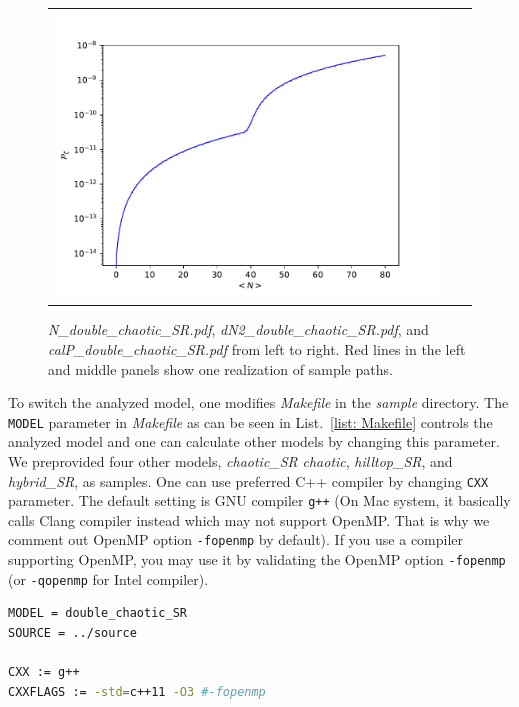 \documentclass[aps, prd
, preprint
, nofootinbib 
, notitlepage
, superscriptaddress
, longbibliography
]{revtex4-1}
\begin{document}
\begin{figure}
\begin{tabular}{ccc}
\begin{minipage}{0.33\hsize}
			\includegraphics[width=\hsize]{figs/calP_double_chaotic_SR.pdf}
		\end{minipage}
	\end{tabular}
	\caption{\textit{N\_double\_chaotic\_SR.pdf}, \textit{dN2\_double\_chaotic\_SR.pdf}, and \textit{calP\_double\_chaotic\_SR.pdf} from left to right.
	Red lines in the left and middle panels show one realization of sample paths.}
	\label{fig: double_chaotic_conf}
\end{figure}

To switch the analyzed model, one modifies \textit{Makefile} in the \textit{sample} directory. The \texttt{MODEL} parameter in \textit{Makefile} 
as can be seen in List.~\ref{list: Makefile} controls the analyzed model and one can calculate other models by changing this parameter.
We preprovided four other models, \textit{chaotic\_SR} \textit{chaotic}, \textit{hilltop\_SR}, and \textit{hybrid\_SR}, as samples.
One can use preferred C++ compiler by changing \texttt{CXX} parameter. The default setting is GNU compiler \texttt{g++} (On Mac system, it basically calls 
Clang compiler instead which may not support OpenMP. That is why we comment out OpenMP option \texttt{-fopenmp} by default).
If you use a compiler supporting OpenMP, you may use it by validating the OpenMP option \texttt{-fopenmp} (or \texttt{-qopenmp} for Intel compiler).

\begin{lstlisting}[language = bash, caption={\textit{sample/Makefile}}, label=list: Makefile]
MODEL = double_chaotic_SR
SOURCE = ../source

CXX := g++
CXXFLAGS := -std=c++11 -O3 #-fopenmp
\end{lstlisting}
\end{document}
